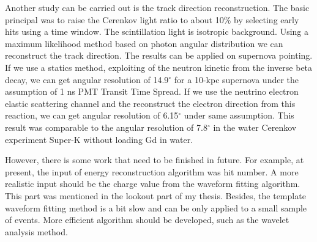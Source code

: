 \begin{englishabstract}
Another study can be carried out is the track direction reconstruction. The basic principal was to raise the Cerenkov light ratio to about 10\% by selecting early hits using a time window. The scintillation light is isotropic background. Using a maximum likelihood method based on photon angular distribution we can reconstruct the track direction. The results can be applied on supernova pointing. If we use a statics method, exploiting of the neutron kinetic from the inverse beta decay, we can get angular resolution of 14.9$^{\circ}$ for a 10-kpc supernova under the assumption of 1 ns PMT Transit Time Spread. If we use the neutrino electron elastic scattering channel and the reconstruct the electron direction from this reaction, we can get  angular resolution of 6.15$^{\circ}$ under same assumption. This result was comparable to the angular resolution of 7.8$^{\circ}$  in the water Cerenkov experiment Super-K without loading Gd in water.

However, there is some work that need to be finished in future. For example, at present, the input of energy reconstruction algorithm was hit number. A more realistic input should be the charge value from the waveform fitting algorithm. This part was mentioned in the lookout part of my thesis. Besides, the template waveform fitting method is a bit slow and can be only applied to a small sample of events. More efficient algorithm should be developed, such as the wavelet analysis method.

\end{englishabstract}
